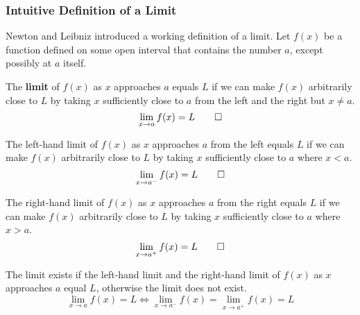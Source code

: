 \subsubsection{Intuitive Definition of a Limit}
Newton and Leibniz introduced a working definition of a limit.
Let \(f(x)\) be a function defined on some open interval that contains the
number \(a\), except possibly at \(a\) itself.
\begin{definition}
    The \textbf{limit} of \(f(x)\) as \(x\) approaches \(a\) equals \(L\) if
    we can make \(f(x)\) arbitrarily close to \(L\) by taking \(x\)
    sufficiently close to \(a\) from the left and the right but \(x\neq a\).
    \[\lim_{x\to a}f(x)=L\qedhere\]
\end{definition}
\begin{definition}
    The left-hand limit of \(f(x)\) as \(x\) approaches \(a\) from the left
    equals \(L\) if we can make \(f(x)\) arbitrarily close to \(L\) by taking
    \(x\) sufficiently close to \(a\) where \(x<a\).
    \[\lim_{x\to a^-}f(x)=L\qedhere\]
\end{definition}
\begin{definition}
    The right-hand limit of \(f(x)\) as \(x\) approaches \(a\) from the right
    equals \(L\) if we can make \(f(x)\) arbitrarily close to \(L\) by taking
    \(x\) sufficiently close to \(a\) where \(x>a\).
    \[\lim_{x\to a^+}f(x)=L\qedhere\]
\end{definition}
The limit exists if the left-hand limit and the right-hand limit of \(f(x)\)
as \(x\) approaches \(a\) equal \(L\), otherwise the limit does not exist.
\[\lim_{x\to a}f(x)=L\iff\lim_{x\to a^-}f(x)=\lim_{x\to a^+}f(x)=L\]